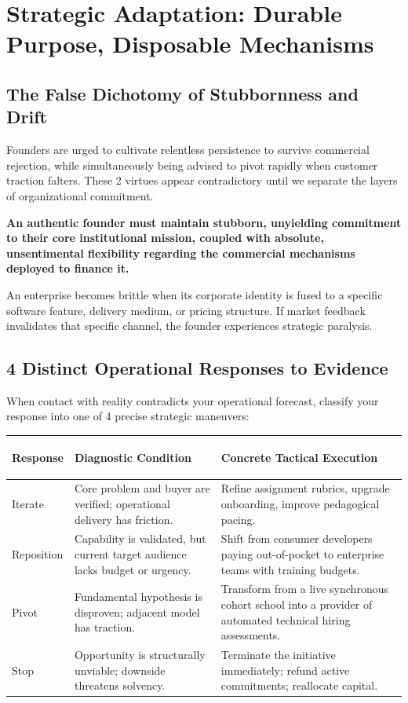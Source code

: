 \section{Strategic Adaptation: Durable Purpose, Disposable Mechanisms}

\subsection{The False Dichotomy of Stubbornness and Drift}

Founders are urged to cultivate relentless persistence to survive commercial rejection, while simultaneously being advised to pivot rapidly when customer traction falters. These 2 virtues appear contradictory until we separate the layers of organizational commitment.

\textbf{An authentic founder must maintain stubborn, unyielding commitment to their core institutional mission, coupled with absolute, unsentimental flexibility regarding the commercial mechanisms deployed to finance it.}

An enterprise becomes brittle when its corporate identity is fused to a specific software feature, delivery medium, or pricing structure. If market feedback invalidates that specific channel, the founder experiences strategic paralysis.

\subsection{4 Distinct Operational Responses to Evidence}

When contact with reality contradicts your operational forecast, classify your response into one of 4 precise strategic maneuvers:

\begin{tcolorbox}[
  enhanced,
  colback=BayesSurface!60,
  colframe=BayesBorder,
  boxrule=0.5pt,
  arc=3pt,
  left=3pt,right=3pt,top=3pt,bottom=3pt,
  boxsep=1pt
]
\scriptsize
\begin{tabularx}{\linewidth}{>{\bfseries\raggedright\arraybackslash}p{2.1cm} X X}
\toprule
\textbf{Response} & \textbf{Diagnostic Condition} & \textbf{Concrete Tactical Execution} \\
\midrule
Iterate & Core problem and buyer are verified; operational delivery has friction. & Refine assignment rubrics, upgrade onboarding, improve pedagogical pacing. \\
\addlinespace[2pt]
Reposition & Capability is validated, but current target audience lacks budget or urgency. & Shift from consumer developers paying out-of-pocket to enterprise teams with training budgets. \\
\addlinespace[2pt]
Pivot & Fundamental hypothesis is disproven; adjacent model has traction. & Transform from a live synchronous cohort school into a provider of automated technical hiring assessments. \\
\addlinespace[2pt]
Stop & Opportunity is structurally unviable; downside threatens solvency. & Terminate the initiative immediately; refund active commitments; reallocate capital. \\
\bottomrule
\end{tabularx}
\end{tcolorbox}

